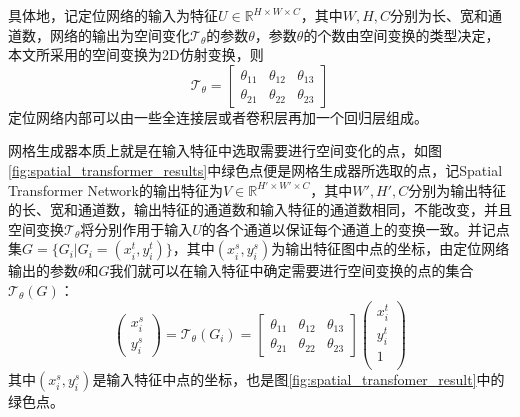 具体地，记定位网络的输入为特征$U\in \mathbb{R}^{H\times W\times C}$，其中$W,H,C$分别为长、宽和通道数，网络的输出为空间变化$\mathcal{T}_{\theta}$的参数$\theta$，参数$\theta$的个数由空间变换的类型决定，本文所采用的空间变换为2D仿射变换，则
\begin{equation}
  \mathcal{T}_\theta = \left[
    \begin{array}{ccc}
      \theta_{11}&\theta_{12}&\theta_{13}\\
      \theta_{21}&\theta_{22}&\theta_{23}
    \end{array}
    \right]
\end{equation}
定位网络内部可以由一些全连接层或者卷积层再加一个回归层组成。

网格生成器本质上就是在输入特征中选取需要进行空间变化的点，如图\ref{fig:spatial_transformer_results}中绿色点便是网格生成器所选取的点，记Spatial Transformer Network的输出特征为$V\in \mathbb{R}^{H'\times W'\times C}$，其中$W',H',C$分别为输出特征的长、宽和通道数，输出特征的通道数和输入特征的通道数相同，不能改变，并且空间变换$\mathcal{T}_{\theta}$将分别作用于输入$U$的各个通道以保证每个通道上的变换一致。并记点集$G = \{G_i|G_i = (x^t_i, y^t_i)\}$，其中$(x_i^s, y_i^s)$为输出特征图中点的坐标，由定位网络输出的参数$\theta$和$G$我们就可以在输入特征中确定需要进行空间变换的点的集合$\mathcal{T}_\theta(G)$：
\begin{equation}
  \left(
    \begin{array}{c}
      x_i^s\\
      y_i^s
    \end{array}
  \right) = \mathcal{T}_\theta(G_i) =
  \left[
    \begin{array}{ccc}
    \theta_{11}&\theta_{12}&\theta_{13}\\
    \theta_{21}&\theta_{22}&\theta_{23}
    \end{array}
  \right]
  \left(
    \begin{array}{c}
      x_i^t\\
      y_i^t\\
      1\\
    \end{array}
  \right)
\end{equation}
其中$(x_i^s, y_i^s)$是输入特征中点的坐标，也是图\ref{fig:spatial_transfomer_result}中的绿色点。

